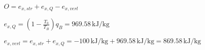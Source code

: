 \( O = e_{x,str} + e_{x,Q} - e_{x,verl} \)  

\( e_{x,Q} = \left(1 - \frac{T_0}{T_B}\right) q_B = 969.58 \, \text{kJ/kg} \)  

\( e_{x,verl} = e_{x,str} + e_{x,Q} = -100 \, \text{kJ/kg} + 969.58 \, \text{kJ/kg} = 869.58 \, \text{kJ/kg} \)